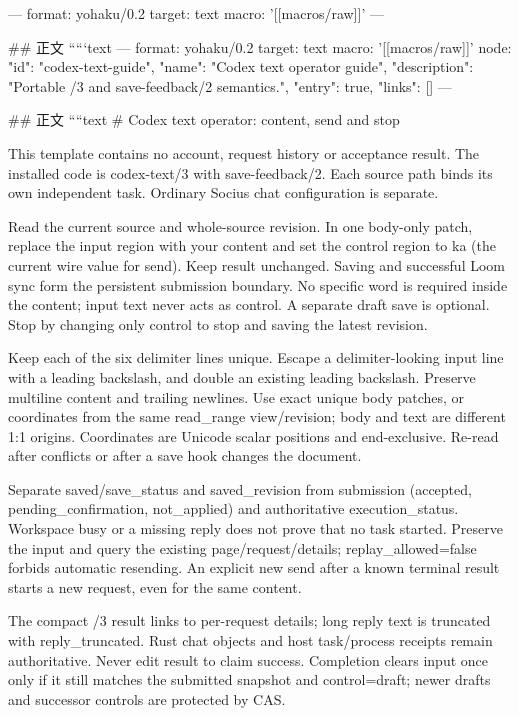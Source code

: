---
format: yohaku/0.2
target: text
macro: '[[macros/raw]]'
---

## 正文
`````text
---
format: yohaku/0.2
target: text
macro: '[[macros/raw]]'
node: {"id": "codex-text-guide", "name": "Codex text operator guide", "description": "Portable /3 and save-feedback/2 semantics.", "entry": true, "links": []}
---

## 正文
````text
# Codex text operator: content, send and stop

This template contains no account, request history or acceptance result. The installed code is codex-text/3 with save-feedback/2. Each source path binds its own independent task. Ordinary Socius chat configuration is separate.

Read the current source and whole-source revision. In one body-only patch, replace the input region with your content and set the control region to ka (the current wire value for send). Keep result unchanged. Saving and successful Loom sync form the persistent submission boundary. No specific word is required inside the content; input text never acts as control. A separate draft save is optional. Stop by changing only control to stop and saving the latest revision.

Keep each of the six delimiter lines unique. Escape a delimiter-looking input line with a leading backslash, and double an existing leading backslash. Preserve multiline content and trailing newlines. Use exact unique body patches, or coordinates from the same read_range view/revision; body and text are different 1:1 origins. Coordinates are Unicode scalar positions and end-exclusive. Re-read after conflicts or after a save hook changes the document.

Separate saved/save_status and saved_revision from submission (accepted, pending_confirmation, not_applied) and authoritative execution_status. Workspace busy or a missing reply does not prove that no task started. Preserve the input and query the existing page/request/details; replay_allowed=false forbids automatic resending. An explicit new send after a known terminal result starts a new request, even for the same content.

The compact /3 result links to per-request details; long reply text is truncated with reply_truncated. Rust chat objects and host task/process receipts remain authoritative. Never edit result to claim success. Completion clears input once only if it still matches the submitted snapshot and control=draft; newer drafts and successor controls are protected by CAS.

